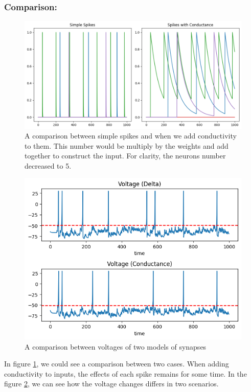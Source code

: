 \documentclass{article}
\begin{document}
	\subsubsection*{Comparison:}
	\begin{figure}[h]
		\includegraphics[width=\textwidth]{condG.png}
		\caption{A comparison between simple spikes and when we add conductivity to them. This number would be multiply by the weights and add together to construct the input. For clarity, the neurons number decreased to 5.}
		\label{condG}
	\end{figure}
	\begin{figure}
		\includegraphics[width=\textwidth]{voltageComp.png}
		\caption{A comparison between voltages of two models of synapses}
		\label{volComp}
	\end{figure}
	In figure \ref{condG}, we could see a comparison between two cases. When adding conductivity to inputs, the effects of each spike remains for some time. In the figure \ref{volComp}, we can see how the voltage changes differs in two scenarios.
	
\end{document}
